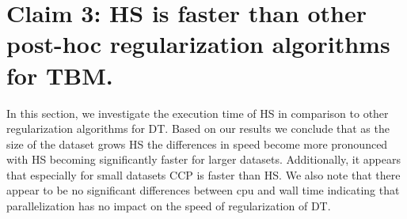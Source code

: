 \section{Claim 3: HS is faster than other post-hoc regularization algorithms for TBM.}
\label{appendix:claim3}

In this section, we investigate the execution time of HS in comparison to other regularization algorithms for DT. 
Based on our results we conclude that as the size of the dataset grows HS the differences in speed become more pronounced with HS becoming significantly faster for larger datasets.
Additionally, it appears that especially for small datasets CCP is faster than HS.
We also note that there appear to be no significant differences between cpu and wall time indicating that parallelization has no impact on the speed of regularization of DT.


